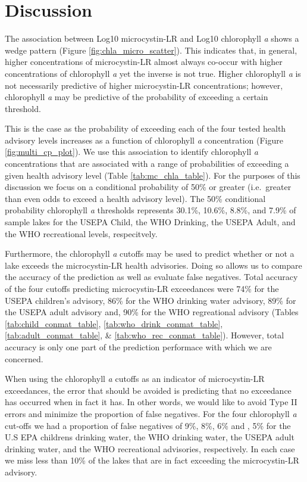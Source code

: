\documentclass[11pt,]{article}
\begin{document}
\section{Discussion}\label{discussion}

The association between Log10 microcystin-LR and Log10 chlorophyll
\emph{a} shows a wedge pattern (Figure \ref{fig:chla_micro_scatter}).
This indicates that, in general, higher concentrations of microcystin-LR
almost always co-occur with higher concentrations of chlorophyll
\emph{a} yet the inverse is not true. Higher chlorophyll \emph{a} is not
necessarily predictive of higher microcystin-LR concentrations; however,
chlorophyll \emph{a} may be predictive of the probability of exceeding a
certain threshold.

This is the case as the probability of exceeding each of the four tested
health advisory levels increases as a function of chlorophyll \emph{a}
concentration (Figure \ref{fig:multi_cp_plot}). We use this association
to identify chlorophyll \emph{a} concentrations that are associated with
a range of probabilities of exceeding a given health advisory level
(Table \ref{tab:mc_chla_table}). For the purposes of this discussion we
focus on a conditional probability of 50\% or greater (i.e.~greater than
even odds to exceed a health advisory level). The 50\% conditional
probability chlorophyll \emph{a} thresholds represents 30.1\%, 10.6\%,
8.8\%, and 7.9\% of sample lakes for the USEPA Child, the WHO Drinking,
the USEPA Adult, and the WHO recreational levels, respecitvely.

Furthermore, the chlorophyll \emph{a} cutoffs may be used to predict
whether or not a lake exceeds the microcystin-LR health advisories.
Doing so allows us to compare the accuracy of the prediction as well as
evaluate false negatives. Total accuracy of the four cutoffs predicting
microcystin-LR exceedances were 74\% for the USEPA children's advisory,
86\% for the WHO drinking water advisory, 89\% for the USEPA adult
advisory and, 90\% for the WHO regreational advisory (Tables
\ref{tab:child_conmat_table}, \ref{tab:who_drink_conmat_table},
\ref{tab:adult_conmat_table}, \& \ref{tab:who_rec_conmat_table}).
However, total accuracy is only one part of the prediction performace
with which we are concerned.

When using the chlorophyll \emph{a} cutoffs as an indicator of
microcystin-LR exceedances, the error that should be avoided is
predicting that no exceedance has occurred when in fact it has. In other
words, we would like to avoid Type II errors and minimize the proportion
of false negatives. For the four chlorophyll \emph{a} cut-offs we had a
proportion of false negatives of 9\%, 8\%, 6\% and , 5\% for the U.S EPA
childrens drinking water, the WHO drinking water, the USEPA adult
drinking water, and the WHO recreational advisories, respectively. In
each case we miss less than 10\% of the lakes that are in fact exceeding
the microcystin-LR advisory.
\end{document}
